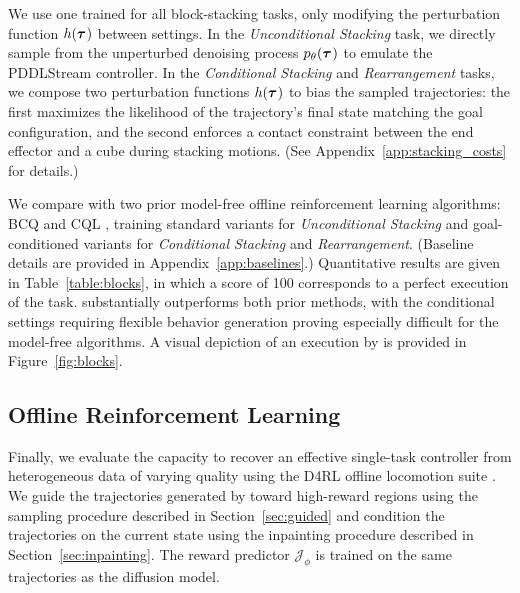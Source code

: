 We use one trained \method for all block-stacking tasks, only modifying the perturbation function $h(\bm{\tau}^{})$ between settings.
In the {\it Unconditional Stacking} task, we directly sample from the unperturbed denoising process $p_\theta(\bm{\tau}^{})$ to emulate the PDDLStream controller.
In the {\it Conditional Stacking} and {\it Rearrangement} tasks, we compose two perturbation functions $h(\bm{\tau}^{})$ to bias the sampled trajectories: the first maximizes the likelihood of the trajectory's final state matching the goal configuration, and the second enforces a contact constraint between the end effector and a cube during stacking motions.
(See Appendix~\ref{app:stacking_costs} for details.)



We compare with two prior model-free offline reinforcement learning algorithms: BCQ \citep{fujimoto2019off} and CQL \citep{kumar2020conservative}, training standard variants for {\it Unconditional Stacking} and goal-conditioned variants for {\it Conditional Stacking} and {\it Rearrangement}.
(Baseline details are provided in Appendix~\ref{app:baselines}.)
Quantitative results are given in Table~\ref{table:blocks}, in which a score of 100 corresponds to a perfect execution of the task.
\method substantially outperforms both prior methods, with the conditional settings requiring flexible behavior generation proving especially difficult for the model-free algorithms.
A visual depiction of an execution by \method is provided in Figure~\ref{fig:blocks}.

\subsection{Offline Reinforcement Learning}
\label{sec:locomotion}
\vspace{-.1cm}


Finally, we evaluate the capacity to recover an effective single-task controller from heterogeneous data of varying quality using the D4RL offline locomotion suite \citep{fu2020d4rl}.
We guide the trajectories generated by \method toward high-reward regions using the sampling procedure described in Section~\ref{sec:guided} and condition the trajectories on the current state using the inpainting procedure described in Section~\ref{sec:inpainting}.
The reward predictor $\mathcal{J}_\phi$ is trained on the same trajectories as the diffusion model.

